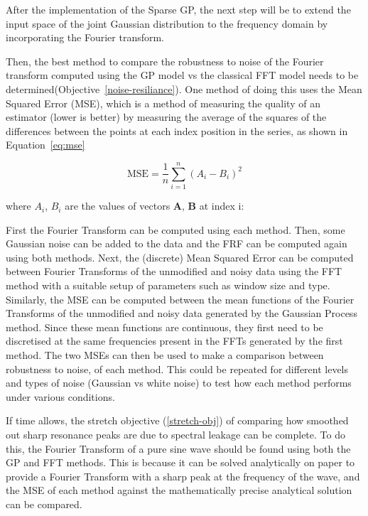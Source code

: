 \documentclass[12pt]{article}
\begin{document}
    After the implementation of the Sparse GP, the next step will be to extend the input space of the joint Gaussian distribution to the frequency domain by incorporating the Fourier transform.

    Then, the best method to compare the robustness to noise of the Fourier transform computed using the GP model vs the classical FFT model needs to be determined(Objective~\ref{noise-resiliance}).
    One method of doing this uses the Mean Squared Error (MSE), which is a method of measuring the quality of an estimator (lower is better) by measuring the average of the squares of the differences between the points at each index position in the series, as shown in Equation~\ref{eq:mse}

    \begin{equation}
        \text{MSE} = \frac{1}{n} \sum_{i=1}^{n} (A_i - B_i)^2
        \label{eq:mse}
    \end{equation}


    where $A_i$, $B_i$ are the values of vectors $\mathbf{A}$, $\mathbf{B}$ at index i:

    First the Fourier Transform can be computed using each method.
    Then, some Gaussian noise can be added to the data and the FRF can be computed again using both methods.
    Next, the (discrete) Mean Squared Error can be computed between Fourier Transforms of the unmodified and noisy data using the FFT method with a suitable setup of parameters such as window size and type.
    Similarly, the MSE can be computed between the mean functions of the Fourier Transforms of the unmodified and noisy data generated by the Gaussian Process method.
    Since these mean functions are continuous, they first need to be discretised at the same frequencies present in the FFTs generated by the first method.
    The two MSEs can then be used to make a comparison between robustness to noise, of each method.
    This could be repeated for different levels and types of noise (Gaussian vs white noise) to test how each method performs under various conditions.

    If time allows, the stretch objective (\ref{stretch-obj}) of comparing how smoothed out sharp resonance peaks are due to spectral leakage can be complete.
    To do this, the Fourier Transform of a pure sine wave should be found using both the GP and FFT methods.
    This is because it can be solved analytically on paper to provide a Fourier Transform with a sharp peak at the frequency of the wave, and the MSE of each method against the mathematically precise analytical solution can be compared.
\end{document}
